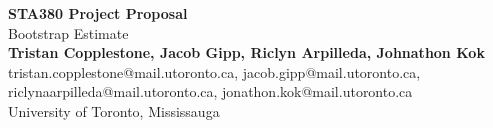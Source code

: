 \documentclass{article}
\begin{document}
	\begin{center}
    
    
		\LARGE{\textbf{STA380 Project Proposal}} \\
        \vspace{1em}
        \Large{Bootstrap Estimate} \\
        \vspace{1em}
        \normalsize\textbf{Tristan Copplestone, Jacob Gipp, Riclyn Arpilleda, Johnathon Kok} \\
        \normalsize{tristan.copplestone@mail.utoronto.ca, jacob.gipp@mail.utoronto.ca, riclynaarpilleda@mail.utoronto.ca, jonathon.kok@mail.utoronto.ca} \\
        \vspace{1em}
        \normalsize{University of Toronto, Mississauga}
     
	\end{center}
\end{document}
